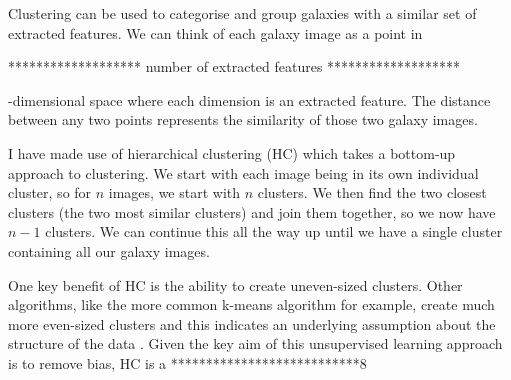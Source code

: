 \documentclass[12pt, onecolumn]{article}
\begin{document}
        Clustering can be used to categorise and group galaxies with a similar set of extracted features. We can think of each galaxy image as a point in 
        
        \vspace{5mm}
        ******************* number of extracted features *******************
        \vspace{5mm}
        
        -dimensional space where each dimension is an extracted feature. The distance between any two points represents the similarity of those two galaxy images.
        
        I have made use of hierarchical clustering (HC) which takes a bottom-up approach to clustering. We start with each image being in its own individual cluster, so for $n$ images, we start with $n$ clusters. We then find the two closest clusters (the two most similar clusters) and join them together, so we now have $n-1$ clusters. We can continue this all the way up until we have a single cluster containing all our galaxy images.

        One key benefit of HC is the ability to create uneven-sized clusters. Other algorithms, like the more common k-means algorithm for example, create much more even-sized clusters and this indicates an underlying assumption about the structure of the data \cite{hc_clustering_benefit}. Given the key aim of this unsupervised learning approach is to remove bias, HC is a ***************************8
    
\end{document}
